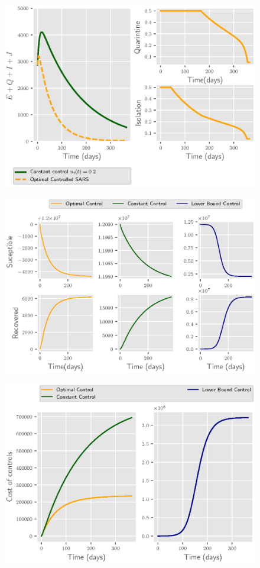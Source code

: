 \begin{figure}[H]
  \centering
  \includegraphics{Figures/figure_1_sars}
  \caption{}
  \label{fig:figure1sars}
\end{figure}

\begin{figure}[H]
  \centering
  \includegraphics{Figures/figure_2_sars}
  \caption{}
  \label{fig:figure2sars}
\end{figure}

\begin{figure}[H]
  \centering
  \includegraphics{Figures/figure_3_sars}
  \caption{}
  \label{fig:figure3sars}
\end{figure}
